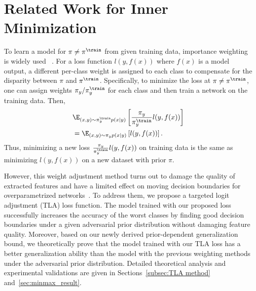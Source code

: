 \section{Related Work for Inner Minimization}
\label{subsec:related_work_min}

To learn a model for $\pi \ne \pi^{\train}$ from given training data, importance weighting is widely used ~\cite{li2023wat, zhang2020coping, sagawa2019distributionally, alaiz2005minimax, alaiz2007minimax}. For a loss function $l(y,f(x))$ where $f(x)$ is a model output, a different per-class weight is assigned to each class to compensate for the disparity between $\pi$ and $\pi^{\train}$. Specifically, to minimize the loss at $\pi \ne \pi^{\train}$, one can assign weights $\pi_{y} / \pi^{\train}_{y}$ for each class and then train a network on the training data. Then,
\begin{align}
&\E_{(x,y)\sim \pi^{\train}_{y} p(x|y)} \left[ \frac{\pi_{y}}{\pi^{\train}_{y}} l(y,f(x))  \right] \\
&= \E_{(x,y) \sim \pi_{y} p(x|y)} \left[ l(y,f(x))  \right].
\end{align}
Thus, minimizing a new loss $\frac{\pi_{y}}{\pi^{\train}_{y}} l(y,f(x))$ on training data is the same as minimizing $l(y,f(x))$ on a new dataset with prior $\pi$.

However, this weight adjustment method turns out to damage the quality of extracted features and have a limited effect on moving decision boundaries for overparametrized networks~\cite{cao2019learning, menon2020long, ye2020identifying, kini2021label}. To address them, we propose a targeted logit adjustment (TLA) loss function. The model trained with our proposed loss successfully increases the accuracy of the worst classes by finding good decision boundaries under a given adversarial prior distribution without damaging feature quality. 
 Moreover, based on our newly derived prior-dependent generalization bound, we theoretically prove that the model trained with our TLA loss has a better generalization ability than the model with the previous weighting methods under the adversarial prior distribution. Detailed theoretical analysis and experimental validations are given in Sections~\ref{subsec:TLA method} and~\ref{sec:minmax_result}.